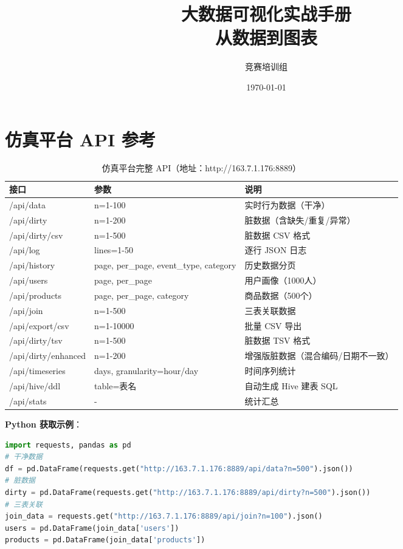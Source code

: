 \documentclass[12pt,a4paper]{article}
\title{\textbf{大数据可视化实战手册}\\[0.5em]\large 从数据到图表}
\author{竞赛培训组}
\date{\today}
\begin{document}
\maketitle

\section*{仿真平台 API 参考}

\begin{table}[H]
\centering
\caption{仿真平台完整 API（地址：http://163.7.1.176:8889）}
{\footnotesize
\begin{tabular}{lll}
\toprule
\textbf{接口} & \textbf{参数} & \textbf{说明} \\
\midrule
/api/data & n=1-100 & 实时行为数据（干净） \\
/api/dirty & n=1-200 & 脏数据（含缺失/重复/异常） \\
/api/dirty/csv & n=1-500 & 脏数据 CSV 格式 \\
/api/log & lines=1-50 & 逐行 JSON 日志 \\
/api/history & page, per\_page, event\_type, category & 历史数据分页 \\
/api/users & page, per\_page & 用户画像（1000人） \\
/api/products & page, per\_page, category & 商品数据（500个） \\
/api/join & n=1-500 & 三表关联数据 \\
/api/export/csv & n=1-10000 & 批量 CSV 导出 \\
/api/dirty/tsv & n=1-500 & 脏数据 TSV 格式 \\
/api/dirty/enhanced & n=1-200 & 增强版脏数据（混合编码/日期不一致） \\
/api/timeseries & days, granularity=hour/day & 时间序列统计 \\
/api/hive/ddl & table=表名 & 自动生成 Hive 建表 SQL \\
/api/stats & - & 统计汇总 \\
\bottomrule
\end{tabular}
}
\end{table}

\textbf{Python 获取示例}：
\begin{lstlisting}[language=Python]
import requests, pandas as pd
# 干净数据
df = pd.DataFrame(requests.get("http://163.7.1.176:8889/api/data?n=500").json())
# 脏数据
dirty = pd.DataFrame(requests.get("http://163.7.1.176:8889/api/dirty?n=500").json())
# 三表关联
join_data = requests.get("http://163.7.1.176:8889/api/join?n=100").json()
users = pd.DataFrame(join_data['users'])
products = pd.DataFrame(join_data['products'])
\end{lstlisting}
\end{document}

